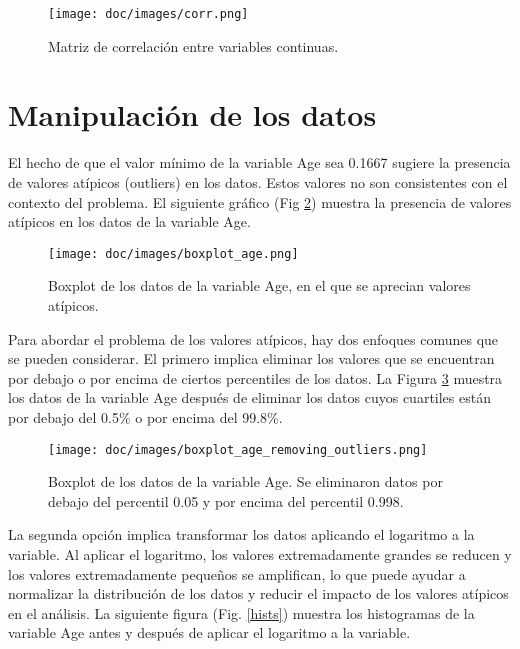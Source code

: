 \documentclass{article}
\begin{document}
\begin{figure}[htbp]
    \centering
    \texttt{[image: doc/images/corr.png]} 
    \caption{Matriz de correlaci\'on entre variables continuas.}
    \label{fig:corr_var}
\end{figure}

\section{Manipulaci\'on de los datos}

El hecho de que el valor mínimo de la variable Age sea 0.1667 sugiere la presencia de valores atípicos (outliers) en los datos. Estos valores no son consistentes con el contexto del problema. El siguiente gr\'afico (Fig \ref{fig:boxplot_age}) muestra la presencia de valores at\'ipicos en los datos de la variable Age.

\begin{figure}[htbp]
    \centering
    \texttt{[image: doc/images/boxplot\_age.png]} 
    \caption{Boxplot de los datos de la variable Age, en el que se aprecian valores at\'ipicos.}
    \label{fig:boxplot_age}
\end{figure}

Para abordar el problema de los valores atípicos, hay dos enfoques comunes que se pueden considerar. El primero implica eliminar los valores que se encuentran por debajo o por encima de ciertos percentiles de los datos. La Figura \ref{fig:boxplot_age_2} muestra los datos de la variable Age despu\'es de eliminar los datos cuyos cuartiles están por debajo del 0.5\% o por encima del 99.8\%.

\begin{figure}[htbp]
    \centering
    \texttt{[image: doc/images/boxplot\_age\_removing\_outliers.png]} 
    \caption{Boxplot de los datos de la variable Age. Se eliminaron datos por debajo del percentil 0.05 y por encima del percentil 0.998.}
    \label{fig:boxplot_age_2}
\end{figure}

La segunda opción implica transformar los datos aplicando el logaritmo a la variable. Al aplicar el logaritmo, los valores extremadamente grandes se reducen y los valores extremadamente pequeños se amplifican, lo que puede ayudar a normalizar la distribución de los datos y reducir el impacto de los valores atípicos en el análisis. La siguiente figura (Fig. \ref{hists}) muestra los histogramas de la variable Age antes y despu\'es de aplicar el logaritmo a la variable.
\end{document}
